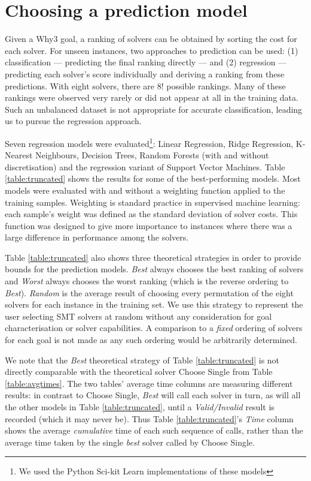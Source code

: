 \documentclass[submission,copyright,creativecommons]{eptcs}
\begin{document}
\section{Choosing a prediction model}
\label{sec:predselection}
Given a \textsf{Why3} goal, a ranking of solvers can be obtained by sorting the cost for each solver. For unseen instances, two approaches to prediction can be used: (1) classification --- predicting the final ranking directly --- and (2) regression --- predicting each solver's score individually and deriving a ranking from these predictions.  With eight solvers, there are $8!$ possible rankings. Many of these rankings were observed very rarely or did not appear at all in the training data. Such an unbalanced dataset is not appropriate for accurate classification, leading us to pursue the regression approach.

Seven regression models were evaluated\footnote{We used the Python Sci-kit Learn \cite{sklearn} implementations of these models}: Linear Regression, Ridge Regression, K-Nearest Neighbours, Decision Trees, Random Forests (with and without discretisation) and the regression variant of Support Vector Machines. Table \ref{table:truncated} shows the results for some of the best-performing models. Most models were evaluated with and without a weighting function applied to the training samples. Weighting is standard practice in supervised machine learning: each sample's weight was defined as the standard deviation of solver costs. This function was designed to give more importance to instances where there was a large difference in performance among the solvers. 

Table \ref{table:truncated} also shows three theoretical strategies in order to provide bounds for the prediction models. \textit{Best} always chooses the best ranking of solvers and \textit{Worst} always chooses the worst ranking (which is the reverse ordering to \textit{Best}). \textit{Random} is the average result of choosing every permutation of the eight solvers for each instance in the training set.  We use this strategy to represent the user selecting SMT solvers at random without any consideration for goal characterisation or solver capabilities. 
A comparison to a \textit{fixed} ordering of solvers for each goal is not made as any such ordering would be arbitrarily determined. 

We note that the \textit{Best} theoretical strategy of Table \ref{table:truncated} is not directly comparable with the theoretical solver \textsf{Choose Single} from Table \ref{table:avgtimes}.  The two tables' average time columns are measuring different results: in contrast to \textsf{Choose Single}, \textit{Best} will call each solver in turn, as will all the other models in Table \ref{table:truncated}, until a \textit{Valid/Invalid} result is recorded (which it may never be).  Thus Table \ref{table:truncated}'s \textit{Time} column shows the average \textit{cumulative} time of each such sequence of calls, rather than the average time taken by the single \textit{best} solver called by \textsf{Choose Single}. 
\end{document}
